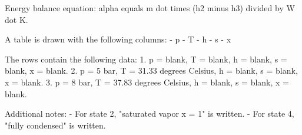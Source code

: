 Energy balance equation:  
alpha equals m dot times (h2 minus h3) divided by W dot K.  

A table is drawn with the following columns:  
- p  
- T  
- h  
- s  
- x  

The rows contain the following data:  
1. p = blank, T = blank, h = blank, s = blank, x = blank.  
2. p = 5 bar, T = 31.33 degrees Celsius, h = blank, s = blank, x = blank.  
3. p = 8 bar, T = 37.83 degrees Celsius, h = blank, s = blank, x = blank.  

Additional notes:  
- For state 2, "saturated vapor x = 1" is written.  
- For state 4, "fully condensed" is written.